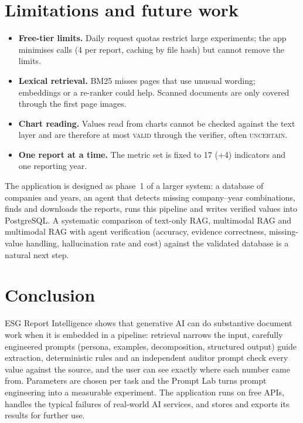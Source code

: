 \documentclass[11pt,a4paper]{article}
\begin{document}
\section{Limitations and future work}
\begin{itemize}
  \item \textbf{Free-tier limits.} Daily request quotas restrict large experiments; the app minimises calls
        (4 per report, caching by file hash) but cannot remove the limits.
  \item \textbf{Lexical retrieval.} BM25 misses pages that use unusual wording; embeddings or a re-ranker could
        help. Scanned documents are only covered through the first page images.
  \item \textbf{Chart reading.} Values read from charts cannot be checked against the text layer and are
        therefore at most \textsc{valid} through the verifier, often \textsc{uncertain}.
  \item \textbf{One report at a time.} The metric set is fixed to 17 (+4) indicators and one reporting year.
\end{itemize}
The application is designed as phase~1 of a larger system: a database of companies and years, an agent that
detects missing company--year combinations, finds and downloads the reports, runs this pipeline and writes
verified values into PostgreSQL. A systematic comparison of text-only RAG, multimodal RAG and multimodal RAG
with agent verification (accuracy, evidence correctness, missing-value handling, hallucination rate and cost)
against the validated database is a natural next step.

\section{Conclusion}
ESG Report Intelligence shows that generative AI can do substantive document work when it is embedded in a
pipeline: retrieval narrows the input, carefully engineered prompts (persona, examples, decomposition,
structured output) guide extraction, deterministic rules and an independent auditor prompt check every
value against the source, and the user can see exactly where each number came from. Parameters are chosen
per task and the Prompt Lab turns prompt engineering into a measurable experiment. The application runs
on free APIs, handles the typical failures of real-world AI services, and stores and exports its results
for further use.
\end{document}
